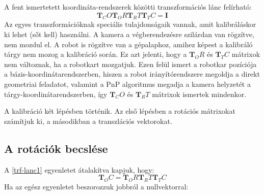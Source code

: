 	A fent ismertetett koordináta-rendszerek közötti transzformációs lánc felírható:
	\begin{equation}\label{trf-lanc1}
	\mathbf{T}_CO\mathbf{T}_OR\mathbf{T}_RT\mathbf{T}_TC = \mathbf{I}
	\end{equation}
	Az egyes transzformációknak speciális tulajdonságaik vannak, amit kalibráláskor ki lehet (sőt kell) használni. A kamera a végberendezésre szilárdan van rögzítve, nem mozdul el. A robot is rögzítve van a gépalaphoz, amihez képest a kalibráló tárgy nem mozog a kalibráció során. Ez azt jelenti, hogy a $\mathbf{T}_OR$ és $\mathbf{T}_TC$ mátrixok nem változnak, ha a robotkart mozgatjuk. Ezen felül ismert a robotkar pozíciója a bázis-koordinátarendszerben, hiszen a robot irányítórendszere megoldja a direkt geometriai feladatot, valamint a PnP algoritmus megadja a kamera helyzetét a tárgy-koordinátarendszerben, így $\mathbf{T}_CO$ és $\mathbf{T}_RT$ mátrixok ismertek mindenkor.
	
	A kalibráció két lépésben történik. Az első lépésben a rotációs mátrixokat számítjuk ki, a másodikban a transzlációs vektorokat.
	\subsection{A rotációk becslése}
	A \eqref{trf-lanc1} egyenletet átalakítva kapjuk, hogy:
	\begin{equation}
	\label{trf-lanc2}
	\mathbf{T}_OC = \mathbf{T}_OR\mathbf{T}_RT\mathbf{T}_TC
	\end{equation}
	Ha az egész egyenletet beszorozzuk jobbról a nullvektorral:
	
